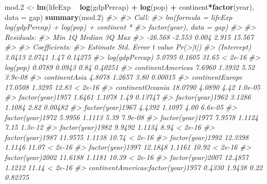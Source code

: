 \documentclass[]{book}
\newenvironment{Shaded}{\begin{snugshade}}{\end{snugshade}}
\newcommand{\CommentTok}[1]{\textcolor[rgb]{0.56,0.35,0.01}{\textit{#1}}}
\newcommand{\DataTypeTok}[1]{\textcolor[rgb]{0.13,0.29,0.53}{#1}}
\newcommand{\FloatTok}[1]{\textcolor[rgb]{0.00,0.00,0.81}{#1}}
\newcommand{\KeywordTok}[1]{\textcolor[rgb]{0.13,0.29,0.53}{\textbf{#1}}}
\newcommand{\NormalTok}[1]{#1}
\newcommand{\OperatorTok}[1]{\textcolor[rgb]{0.81,0.36,0.00}{\textbf{#1}}}
\newcommand{\StringTok}[1]{\textcolor[rgb]{0.31,0.60,0.02}{#1}}
\begin{document}
\begin{Shaded}
\begin{Highlighting}[]
\NormalTok{mod}\FloatTok{.2}\NormalTok{ <-}\StringTok{ }\KeywordTok{lm}\NormalTok{(lifeExp }\OperatorTok{~}\StringTok{ }\KeywordTok{log}\NormalTok{(gdpPercap) }\OperatorTok{+}\StringTok{ }\KeywordTok{log}\NormalTok{(pop) }\OperatorTok{+}\StringTok{ }\NormalTok{continent}\OperatorTok{*}\KeywordTok{factor}\NormalTok{(year), }\DataTypeTok{data =}\NormalTok{ gap)}
\KeywordTok{summary}\NormalTok{(mod}\FloatTok{.2}\NormalTok{)}
\CommentTok{#> }
\CommentTok{#> Call:}
\CommentTok{#> lm(formula = lifeExp ~ log(gdpPercap) + log(pop) + continent * }
\CommentTok{#>     factor(year), data = gap)}
\CommentTok{#> }
\CommentTok{#> Residuals:}
\CommentTok{#>     Min      1Q  Median      3Q     Max }
\CommentTok{#> -26.568  -2.553   0.004   2.915  15.567 }
\CommentTok{#> }
\CommentTok{#> Coefficients:}
\CommentTok{#>                                    Estimate Std. Error t value Pr(>|t|)}
\CommentTok{#> (Intercept)                          3.0413     2.0741    1.47  0.14275}
\CommentTok{#> log(gdpPercap)                       5.0795     0.1605   31.65  < 2e-16}
\CommentTok{#> log(pop)                             0.0789     0.0943    0.84  0.40251}
\CommentTok{#> continentAmericas                    7.6960     1.3932    5.52  3.9e-08}
\CommentTok{#> continentAsia                        4.8078     1.2657    3.80  0.00015}
\CommentTok{#> continentEurope                     17.0508     1.3295   12.83  < 2e-16}
\CommentTok{#> continentOceania                    18.0790     4.0890    4.42  1.0e-05}
\CommentTok{#> factor(year)1957                     1.6461     1.1078    1.49  0.13747}
\CommentTok{#> factor(year)1962                     3.1286     1.1084    2.82  0.00482}
\CommentTok{#> factor(year)1967                     4.4392     1.1097    4.00  6.6e-05}
\CommentTok{#> factor(year)1972                     5.9956     1.1113    5.39  7.9e-08}
\CommentTok{#> factor(year)1977                     7.9578     1.1124    7.15  1.3e-12}
\CommentTok{#> factor(year)1982                     9.9492     1.1134    8.94  < 2e-16}
\CommentTok{#> factor(year)1987                    11.9575     1.1138   10.74  < 2e-16}
\CommentTok{#> factor(year)1992                    12.3398     1.1146   11.07  < 2e-16}
\CommentTok{#> factor(year)1997                    12.1848     1.1161   10.92  < 2e-16}
\CommentTok{#> factor(year)2002                    11.6188     1.1181   10.39  < 2e-16}
\CommentTok{#> factor(year)2007                    12.4857     1.1212   11.14  < 2e-16}
\CommentTok{#> continentAmericas:factor(year)1957   0.4330     1.9438    0.22  0.82375}

\end{Highlighting}
\end{Shaded}
\end{document}
